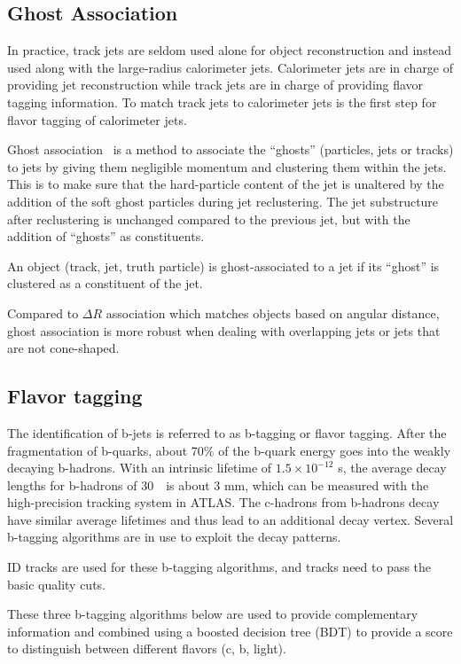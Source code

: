 \subsection{Ghost Association}
\label{sec:ga}

\par In practice, track jets are seldom used alone for object reconstruction and instead used along with the large-radius calorimeter jets. Calorimeter jets are in charge of providing jet reconstruction while track jets are in charge of providing flavor tagging information. To match track jets to calorimeter jets is the first step for flavor tagging of calorimeter jets. 
\par Ghost association~\cite{Cacciari:2007fd,Cacciari:2008gn} is a method to associate the ``ghosts'' (particles, jets or tracks) to jets by giving them negligible momentum and clustering them within the jets. This is to make sure that the hard-particle content of the jet is unaltered by the addition of the soft ghost particles during jet reclustering. The jet substructure after reclustering is unchanged compared to the previous jet, but with the addition of ``ghosts'' as constituents.
\par An object (track, jet, truth particle) is ghost-associated to a jet if its ``ghost'' is clustered as a constituent of the jet.
\par Compared to $\Delta R$ association which matches objects based on angular distance, ghost association is more robust when dealing with overlapping jets or jets that are not cone-shaped.

\subsection{Flavor tagging}
\label{sec:track}

\par The identification of b-jets is referred to as b-tagging or flavor tagging. After the fragmentation of b-quarks, about 70\% of the b-quark energy goes into the weakly decaying b-hadrons. With an intrinsic lifetime of $1.5 \times 10^{-12}$ s, the average decay lengths for b-hadrons of 30~\GeV~is about 3 mm, which can be measured with the high-precision tracking system in ATLAS.
The c-hadrons from b-hadrons decay have similar average lifetimes and thus lead to an additional decay vertex. 
Several b-tagging algorithms are in use to exploit the decay patterns.              
\par ID tracks are used for these b-tagging algorithms, and tracks need to pass the basic quality cuts.         
\par These three b-tagging algorithms below are used to provide complementary information and combined using a boosted decision tree (BDT) to provide a score to distinguish between different flavors (c, b, light).   


